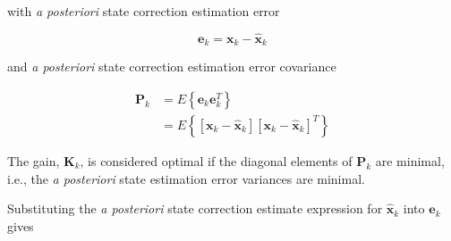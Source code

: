 \documentclass[12pt]{article}
\begin{document}
with \textit{a posteriori} state correction estimation error

\begin{equation*}
    \mathbf{e}_{k} = \mathbf{x}_{k} - \hat{\mathbf{x}}_{k}
\end{equation*}

and \textit{a posteriori} state correction estimation error covariance

\begin{equation*}
    \begin{aligned}
        \mathbf{P}_{k} &= E \left\{ \mathbf{e}_{k} \mathbf{e}_{k}^T \right\} \\
        &= E \left\{ \left[ \mathbf{x}_{k} - \hat{\mathbf{x}}_{k} \right] \left[ \mathbf{x}_{k} - \hat{\mathbf{x}}_{k} \right]^T \right\}
    \end{aligned}
\end{equation*}

The gain, $\mathbf{K}_k$, is considered optimal if the diagonal elements of $\mathbf{P}_k$
are minimal, i.e., the \textit{a posteriori} state estimation error variances are minimal.

Substituting the \textit{a posteriori} state correction estimate expression for
$\hat{\mathbf{x}}_k$ into $\mathbf{e}_k$ gives
\end{document}
